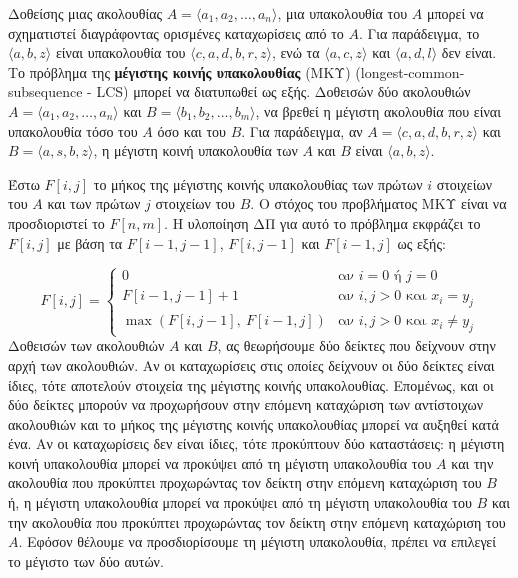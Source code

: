 \documentclass[12pt,a4paper]{article} %
\begin{document}
{{Δοθείσης μιας ακολουθίας $A = \langle a_1, a_2, \ldots, a_n \rangle$,
μια υπακολουθία του $A$ μπορεί να σχηματιστεί διαγράφοντας ορισμένες
καταχωρίσεις από το $A$. Για παράδειγμα, το $\langle a, b, z \rangle$
είναι υπακολουθία του $\langle c, a, d, b, r, z \rangle$, ενώ τα
$\langle a, c, z \rangle$ και $\langle a, d, l \rangle$ δεν είναι.
Το πρόβλημα της \textbf{μέγιστης κοινής υπακολουθίας} (ΜΚΥ) 
(longest-common-subsequence - LCS) μπορεί
να διατυπωθεί ως εξής. Δοθεισών δύο ακολουθιών
$A = \langle a_1, a_2, \ldots, a_n \rangle$ και
$B = \langle b_1, b_2, \ldots, b_m \rangle$, να βρεθεί η μέγιστη
ακολουθία που είναι υπακολουθία τόσο του $A$ όσο και του $B$. Για
παράδειγμα, αν $A = \langle c, a, d, b, r, z \rangle$ και
$B = \langle a, s, b, z \rangle$, η μέγιστη κοινή υπακολουθία
των $A$ και $B$ είναι $\langle a, b, z \rangle$.

Έστω $F[i, j]$ το μήκος της μέγιστης κοινής υπακολουθίας των
πρώτων $i$ στοιχείων του $A$ και των πρώτων $j$ στοιχείων του $B$.
Ο στόχος του προβλήματος ΜΚΥ είναι να προσδιοριστεί το $F[n, m]$.
Η υλοποίηση ΔΠ για αυτό το πρόβλημα εκφράζει το $F[i, j]$ με βάση
τα $F[i-1, j-1]$, $F[i, j-1]$ και $F[i-1, j]$ ως εξής:

\[
F[i, j] =
\begin{cases}
0 & \text{αν } i = 0 \text{ ή } j = 0 \\[4pt]
F[i-1, j-1] + 1 & \text{αν } i, j > 0 \text{ και } x_i = y_j \\[4pt]
\max\left(F[i, j-1],\ F[i-1, j]\right) & \text{αν } i, j > 0 \text{ και } x_i \neq y_j
\end{cases}
\]
\vspace{0.2cm}
Δοθεισών των ακολουθιών $A$ και $B$, ας θεωρήσουμε δύο δείκτες που
δείχνουν στην αρχή των ακολουθιών. Αν οι καταχωρίσεις στις οποίες
δείχνουν οι δύο δείκτες είναι ίδιες, τότε αποτελούν στοιχεία της
μέγιστης κοινής υπακολουθίας. Επομένως, και οι δύο δείκτες μπορούν
να προχωρήσουν στην επόμενη καταχώριση των αντίστοιχων ακολουθιών και
το μήκος της μέγιστης κοινής υπακολουθίας μπορεί να αυξηθεί κατά
ένα. Αν οι καταχωρίσεις δεν είναι ίδιες, τότε προκύπτουν δύο
καταστάσεις: η μέγιστη κοινή υπακολουθία μπορεί να προκύψει από
τη μέγιστη υπακολουθία του $A$ και την ακολουθία που προκύπτει
προχωρώντας τον δείκτη στην επόμενη καταχώριση του $B$ ή, η
μέγιστη υπακολουθία μπορεί να προκύψει από τη μέγιστη
υπακολουθία του $B$ και την ακολουθία που προκύπτει προχωρώντας τον
δείκτη στην επόμενη καταχώριση του $A$. Εφόσον θέλουμε να
προσδιορίσουμε τη μέγιστη υπακολουθία, πρέπει να επιλεγεί το
μέγιστο των δύο αυτών.

}}
\end{document}
